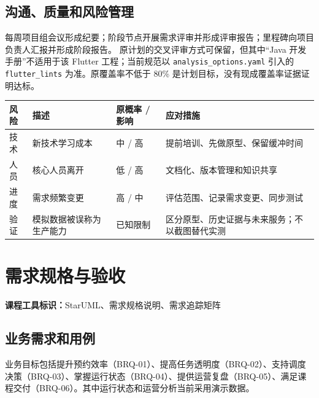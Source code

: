 \documentclass[UTF8,fontset=fandol,zihao=-4,oneside]{ctexrep}
\newcommand{\pathcode}[1]{\nolinkurl{#1}}
\newcommand{\toolmark}[1]{\par\noindent\textbf{课程工具标识：}#1\par}
\begin{document}
\section{沟通、质量和风险管理}
每周项目组会议形成纪要；阶段节点开展需求评审并形成评审报告；里程碑向项目负责人汇报并形成阶段报告。
原计划的交叉评审方式可保留，但其中“Java 开发手册”不适用于该 Flutter 工程；当前规范以 \pathcode{analysis_options.yaml} 引入的 \texttt{flutter\_lints} 为准。原覆盖率不低于 80\% 是计划目标，没有现成覆盖率证据证明达标。

\begin{longtable}{p{2cm}p{4.2cm}p{2cm}p{6.5cm}}
\toprule 风险 & 描述 & 原概率 / 影响 & 应对措施 \\ \midrule
技术 & 新技术学习成本 & 中 / 高 & 提前培训、先做原型、保留缓冲时间 \\
人员 & 核心人员离开 & 低 / 高 & 文档化、版本管理和知识共享 \\
进度 & 需求频繁变更 & 高 / 中 & 评估范围、记录需求变更、同步测试 \\
验证 & 模拟数据被误称为生产能力 & 已知限制 & 区分原型、历史证据与未来服务；不以截图替代实测 \\
\bottomrule
\end{longtable}

\chapter{需求规格与验收}
\toolmark{StarUML、需求规格说明、需求追踪矩阵}
\section{业务需求和用例}
业务目标包括提升预约效率（BRQ-01）、提高任务透明度（BRQ-02）、支持调度决策（BRQ-03）、掌握运行状态（BRQ-04）、提供运营复盘（BRQ-05）、满足课程交付（BRQ-06）。其中运行状态和运营分析当前采用演示数据。
\end{document}
